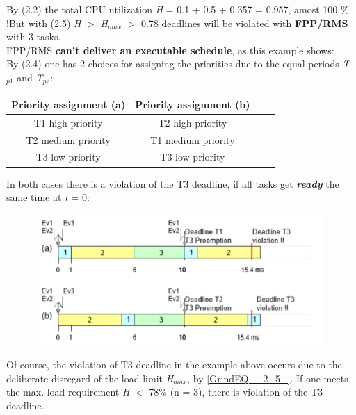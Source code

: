 By (2.2) the total CPU utilization \textit{H} = 0.1 + 0.5 + 0.357 = 0.957, amost 100 \% !But with (2.5) \textit{H} $\mathrm{>}$ \textit{H}${}_{max}$ $\mathrm{>}$ 0.78 deadlines will be violated with \textbf{FPP/RMS} with 3 tasks.\\ 

FPP/RMS \textbf{can't deliver an executable schedule}, as this example shows:\\

By (2.4) one has 2 choices for assigning the priorities due to the equal periods \textit{T}${}_{p1}$\textit{ }and \textit{T}${}_{p2}$:\\

\begin{table}[h!]
\setlength{\tabcolsep}{10pt} %
\renewcommand{\arraystretch}{1.5} %
\small
\centering
 \begin{tabular}{|c|c|c|c|} 
 \hline
 \textbf{Priority assignment (a)} & \textbf{Priority assignment (b)} \\ [0.1ex] 
 \hline
 T1  high priority & T2  high  priority \\ 
 \hline
 T2  medium priority & T1  medium priority \\ 
  \hline
 T3  low priority & T3  low priority  \\ 
 \hline
 \end{tabular}
\end{table}

In both cases there is a violation of the T3 deadline, if all tasks get \textbf{\textit{ready}} the same time at \textit{t} = 0: 

 	\begin{figure}[h]
    \centering
    \includegraphics[width=12cm, height=5cm]{Images/image100.png}
    \label{fig:Fig 45}
    \end{figure}
    
Of course, the violation of T3 deadline in the example above occurs due to the deliberate disregard of the load limit \textit{H${}_{max}$}, by \eqref{GrindEQ__2_5_}. If one meets the max. load requirement \textit{H} $\mathrm{<}$ 78\% (n = 3), there is violation of the T3 deadline.\\

